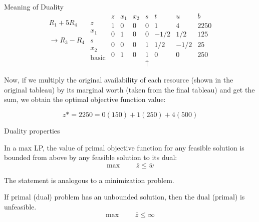 \documentclass[c]{beamer}
\begin{document}
\begin{frame}[allowframebreaks]{Meaning of Duality}
  \begin{equation*}
  \begin{array}{cc}
  &\\
  R_1+5R_4&z \\
  &x_1 \\
  \rightarrow R_3-R_4&s \\
  &x_2\\
  &\mathrm{basic} \\
  \end{array}
  \begin{array}{c|ccccc|c}
    z & x_1 & x_2 & s & t & u & b \\ \hline
    1 & 0 & 0 & 0 & 1 & 4 & 2250 \\ \hline
    0 & 1 & 0 & 0 & -1/2 & 1/2 & 125  \\
    0 & 0 & 0 & 1 & 1/2 & -1/2 & 25 \\
    0 & 1 & 0 & 1 & 0 & 0 & 250 \\
      &  & & \uparrow& & &
  \end{array}
  \end{equation*}

Now, if we multiply the original availability of each resource (shown in the original tableau) by its marginal worth (taken from the final tableau) and get the sum, we obtain the optimal objective function value:

\[
z* = 2250 = 0(150)+1(250)+4(500)
\]

\end{frame}

\begin{frame}{Duality properties}


\begin{theorem}
  In a max LP, the value of primal objective function for any feasible solution is bounded from above by any feasible solution to its dual:
  \[\text{max } \qquad \bar{z} \leq \bar{w} \]
\end{theorem}
The statement is analogous to a minimization problem.
\begin{theorem}
  If primal (dual) problem has an unbounded solution, then the dual (primal) is unfeasible.
  \[\text{max } \qquad \bar{z} \leq \infty \]
\end{theorem}
\end{frame}
\end{document}
